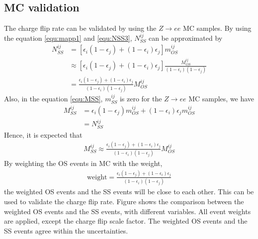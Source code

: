 \subsection{MC validation}
\label{sec:charge_flip_MC_validation}
The charge flip rate can be validated by using the $Z \rightarrow ee$ MC samples.
By using the equation \ref{equ:mapp1} and \ref{equ:NSS3}, $N^{ij}_{SS}$ can be approximated by
\begin{align}
N^{ij}_{SS} &= [ \epsilon_i (1-\epsilon_j) + (1-\epsilon_i) \epsilon_j ] m^{ij}_{OS} \\
&\approx [ \epsilon_i (1-\epsilon_j) + (1-\epsilon_i) \epsilon_j ] \frac{ M^{ij}_{OS} }{ (1-\epsilon_i) (1-\epsilon_j) } \\
&= \frac{\epsilon_i (1-\epsilon_j) + (1-\epsilon_i) \epsilon_j}{(1-\epsilon_i) (1-\epsilon_j)} M^{ij}_{OS}
\end{align}
Also, in the equation \ref{equ:MSS}, $m^{ij}_{SS}$ is zero for the $Z \rightarrow ee$ MC samples, we have
\begin{align}
M^{ij}_{SS} &= \epsilon_i (1-\epsilon_j) m^{ij}_{OS} + (1-\epsilon_i) \epsilon_j m^{ij}_{OS} \\
&= N^{ij}_{SS}
\end{align}
Hence, it is expected that
\begin{align}
M^{ij}_{SS} \approx \frac{\epsilon_i (1-\epsilon_j) + (1-\epsilon_i) \epsilon_j}{(1-\epsilon_i) (1-\epsilon_j)} M^{ij}_{OS}
\end{align}
By weighting the OS events in MC with the weight,
\begin{align}
\text{weight} = \frac{\epsilon_i (1-\epsilon_j) + (1-\epsilon_i) \epsilon_j}{(1-\epsilon_i) (1-\epsilon_j)}
\end{align}
the weighted OS events and the SS events will be close to each other.
This can be used to validate the charge flip rate.
Figure shows the comparison between the weighted OS events and the SS events, with different variables.
All event weights are applied, except the charge flip scale factor.
The weighted OS events and the SS events agree within the uncertainties.

